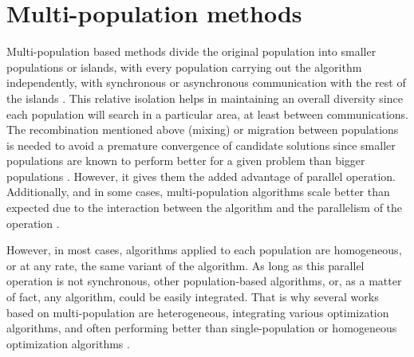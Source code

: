 \documentclass[review]{elsarticle}
\begin{document}
\section{Multi-population methods} %
\label{multi}

Multi-population based methods divide the original population into
smaller populations or islands, with every population carrying out the
algorithm independently, with synchronous or asynchronous communication with the
rest of the islands \cite{Ma2019}.%
This relative isolation helps in maintaining an overall
diversity since each population will search in a particular area, at least
between communications. The recombination mentioned above (mixing) or migration
between populations is needed to avoid a premature convergence of candidate
solutions since smaller populations are known to perform better for a given
problem than bigger populations \cite{li2016multi,wu2016differential}. %
However, it gives them the added advantage of
parallel operation. Additionally, and in some cases, multi-population algorithms
scale better than expected due to the interaction between the algorithm and the
parallelism of the operation \cite{ALBA20027}. %

However, in most cases, algorithms applied to each population are
homogeneous, or at any rate, the same variant of the algorithm. As long as this
parallel operation is not synchronous, other population-based algorithms, or, as
a matter of fact, any algorithm, could be easily integrated. That is why several
works based on multi-population are heterogeneous, integrating various
optimization algorithms, and often performing better than single-population or
homogeneous optimization algorithms \cite{wu2016differential,nseef2016adaptive}.
\end{document}
